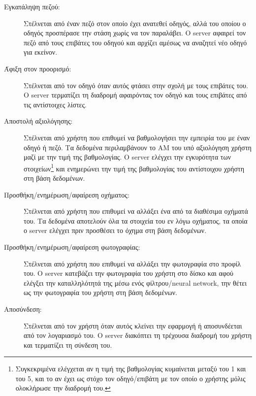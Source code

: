 \documentclass[../thesis.tex]{subfiles}
\begin{document}
\begin{description}
    \item[Εγκατάληψη πεζού:] Στέλνεται από έναν πεζό στον οποίο έχει ανατεθεί οδηγός, αλλά του οποίου ο οδηγός προσπέρασε την στάση χωρίς να τον παραλάβει. Ο server αφαιρεί τον πεζό από τους επιβάτες του οδηγού και αρχίζει αμέσως να αναζητεί νέο οδηγό για εκείνον.
    \item[Άφιξη στον προορισμό:] Στέλνεται από τον οδηγό όταν αυτός φτάσει στην σχολή με τους επιβάτες του. Ο server τερματίζει τη διαδρομή αφαιρόντας τον οδηγό και τους επιβάτες από τις αντίστοιχες λίστες.
    \item[Αποστολή αξιολόγησης:] Στέλνεται από χρήστη που επιθυμεί να βαθμολογήσει την εμπειρία του με έναν οδηγό ή πεζό. Τα δεδομένα περιλαμβάνουν το ΑΜ του υπό αξιολόγηση χρήστη μαζί με την τιμή της βαθμολογίας. Ο server ελέγχει την εγκυρότητα των στοιχείων\footnote{Συγκεκριμένα ελέγχεται αν η τιμή της βαθμολογίας κυμαίνεται μεταξύ του 1 και του 5, και το αν έχει ως στόχο τον οδηγό/επιβάτη με τον οποίο ο χρήστης μόλις ολοκλήρωσε την διαδρομή του.} και ενημερώνει την τιμή της βαθμολογίας του αντίστοιχου χρήστη στη βάση δεδομένων.
    \item[Προσθήκη/ενημέρωση/αφαίρεση οχήματος:] Στέλνεται από χρήστη που επιθυμεί να αλλάξει ένα από τα διαθέσιμα οχήματά του. Τα δεδομένα αποτελούν όλα τα στοιχεία του εν λόγω οχήματος, τα οποία ο server ελέγχει πριν προσθέσει το όχημα στη βάση δεδομένων.
    \item[Προσθήκη/ενημέρωση/αφαίρεση φωτογραφίας:] Στέλνεται από χρήστη που επιθυμεί να αλλάξει την φωτογραφία στο προφίλ του. Ο server κατεβάζει την φωτογραφία του χρήστη στο δίσκο και αφού ελέγξει την καταλληλότητά της μέσω ενός φίλτρου/neural network, την θέτει ως την φωτογραφία του χρήστη στη βάση δεδομένων.
    \item[Αποσύνδεση:] Στέλνεται από τον χρήστη όταν αυτός κλείνει την εφαρμογή ή αποσυνδέεται από τον λογαριασμό του. Ο server διακόπτει τη τρέχουσα διαδρομή του χρήστη και τερματίζει τη σύνδεση του.
\end{description}
\end{document}
